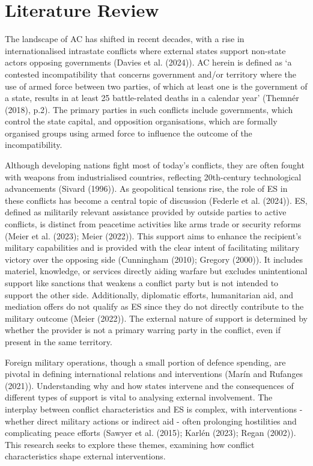 \documentclass[
]{article}
\begin{document}
\section{Literature Review}\label{literature-review}

The landscape of AC has shifted in recent decades, with a rise in
internationalised intrastate conflicts where external states support
non-state actors opposing governments (Davies et al. (2024)). AC herein
is defined as `a contested incompatibility that concerns government
and/or territory where the use of armed force between two parties, of
which at least one is the government of a state, results in at least 25
battle-related deaths in a calendar year' (Themnér (2018), p.2). The
primary parties in such conflicts include governments, which control the
state capital, and opposition organisations, which are formally
organised groups using armed force to influence the outcome of the
incompatibility.

Although developing nations fight most of today's conflicts, they are
often fought with weapons from industrialised countries, reflecting
20th-century technological advancements (Sivard (1996)). As geopolitical
tensions rise, the role of ES in these conflicts has become a central
topic of discussion (Federle et al. (2024)). ES, defined as militarily
relevant assistance provided by outside parties to active conflicts, is
distinct from peacetime activities like arms trade or security reforms
(Meier et al. (2023); Meier (2022)). This support aims to enhance the
recipient's military capabilities and is provided with the clear intent
of facilitating military victory over the opposing side (Cunningham
(2010); Gregory (2000)). It includes materiel, knowledge, or services
directly aiding warfare but excludes unintentional support like
sanctions that weakens a conflict party but is not intended to support
the other side. Additionally, diplomatic efforts, humanitarian aid, and
mediation offers do not qualify as ES since they do not directly
contribute to the military outcome (Meier (2022)). The external nature
of support is determined by whether the provider is not a primary
warring party in the conflict, even if present in the same territory.

Foreign military operations, though a small portion of defence spending,
are pivotal in defining international relations and interventions (Marín
and Rufanges (2021)). Understanding why and how states intervene and the
consequences of different types of support is vital to analysing
external involvement. The interplay between conflict characteristics and
ES is complex, with interventions - whether direct military actions or
indirect aid - often prolonging hostilities and complicating peace
efforts (Sawyer et al. (2015); Karlén (2023); Regan (2002)). This
research seeks to explore these themes, examining how conflict
characteristics shape external interventions.
\end{document}
